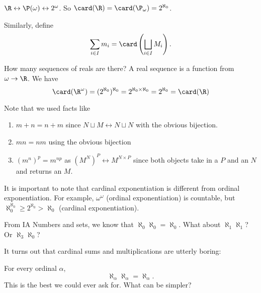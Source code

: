 \documentclass[a4paper]{article}
\begin{document}
\begin{eg}
  $\R \leftrightarrow \P(\omega) \leftrightarrow 2^\omega$. So $\card(\R) = \card(\P_\omega) = 2^{\aleph_0}$.
\end{eg}

Similarly, define
\[
  \sum_{i \in I} m_i = \card\left(\bigsqcup_{i\in I} M_i\right).
\]

\begin{eg}
  How many sequences of reals are there? A real sequence is a function from $\omega \to \R$. We have
  \[
    \card(\R^\omega) = (2^{\aleph_0})^{\aleph_0} = 2^{\aleph_0 \times \aleph_0} = 2^{\aleph_0} = \card(\R)
  \]
\end{eg}
Note that we used facts like
\begin{prop}\leavevmode
  \begin{enumerate}
    \item $m + n = n + m$ since $N\sqcup M \leftrightarrow N\sqcup N$ with the obvious bijection.
    \item $mn = nm$ using the obvious bijection
    \item $(m^n)^p = m^{np}$ as $(M^N)^P \leftrightarrow M^{N\times P}$ since both objects take in a $P$ and an $N$ and returns an $M$.
  \end{enumerate}
\end{prop}
It is important to note that cardinal exponentiation is different from ordinal exponentiation. For example, $\omega^\omega$ (ordinal exponentiation) is countable, but $\aleph_0^{\aleph_0} \geq 2^{\aleph_0} > \aleph_0$ (cardinal exponentiation).

From IA Numbers and sets, we know that $\aleph_0 \aleph_0 = \aleph_0$. What about $\aleph_1 \aleph_1$? Or $\aleph_3 \aleph_0$?

It turns out that cardinal sums and multiplications are utterly boring:
\begin{thm}[]
  For every ordinal $\alpha$,
  \[
    \aleph_\alpha \aleph_\alpha = \aleph_\alpha.
  \]
  This is the best we could ever ask for. What can be simpler?
\end{thm}
\end{document}
